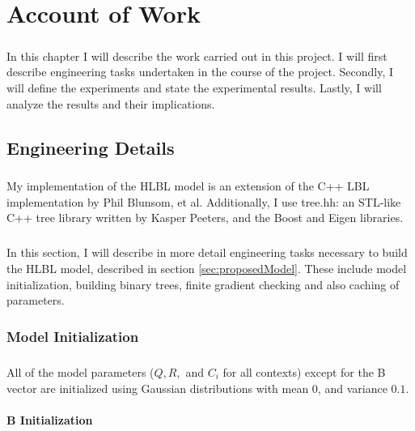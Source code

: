 \documentclass[12pt]{ociamthesis}  %
\begin{document}
\chapter{Account of Work}
\paragraph{}
In this chapter I will describe the work carried out in this project. I will first describe engineering tasks undertaken in the course of the project. Secondly, I will define the experiments and state the experimental results. Lastly, I will analyze the results and their implications.

\section{Engineering Details}
\paragraph{}
My implementation of the HLBL model is an extension of the C++ LBL implementation by Phil Blunsom, et al. Additionally, I use tree.hh: an STL-like C++ tree library written by Kasper Peeters, and the Boost \cite{BoostSite} and Eigen \cite{eigenweb} libraries. 
\paragraph{}
In this section, I will describe in more detail engineering tasks necessary to build the HLBL model, described in section \ref{sec:proposedModel}. These include model initialization, building binary trees, finite gradient checking and also caching of parameters.

\subsection{Model Initialization}
\paragraph{}
All of the model parameters ($Q,R,$ and $C_i$ for all contexts) except for the B vector are initialized using Gaussian distributions with mean $0$, and variance $0.1$.
\subsubsection{B Initialization}
\end{document}
